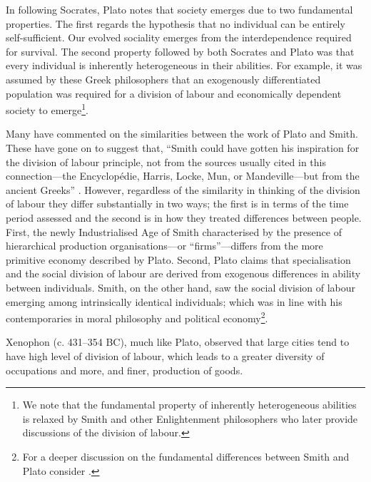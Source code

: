In following Socrates, Plato notes that society emerges due to two fundamental properties. The first regards the hypothesis that no individual can be entirely self-sufficient. Our evolved sociality emerges from the interdependence required for survival. The second property followed by both Socrates and Plato was that every individual is inherently heterogeneous in their abilities. For example, it was assumed by these Greek philosophers that an exogenously differentiated population was required for a division of labour and economically dependent society to emerge\footnote{We note that the fundamental property of inherently heterogeneous abilities is relaxed by Smith and other Enlightenment philosophers who later provide discussions of the division of labour.}.

Many have commented on the similarities between the work of Plato and Smith. These have gone on to suggest that, ``Smith could have gotten his inspiration for the division of labour principle, not from the sources usually cited in this connection---the Encyclop\'{e}die, Harris, Locke, Mun, or Mandeville---but from the ancient Greeks'' \citep[p.~221--222]{Foley1974}. However, regardless of the similarity in thinking of the division of labour they differ substantially in two ways; the first is in terms of the time period assessed and the second is in how they treated differences between people. First, the newly Industrialised Age of Smith characterised by the presence of hierarchical production organisations---or ``firms''---differs from the more primitive economy described by Plato. Second, Plato claims that specialisation and the social division of labour are derived from exogenous differences in ability between individuals. Smith, on the other hand, saw the social division of labour emerging among intrinsically identical individuals; which was in line with his contemporaries in moral philosophy and political economy\footnote{For a deeper discussion on the fundamental differences between Smith and Plato consider \citep{McNulty1975}.}.

Xenophon (c. 431--354 BC), much like Plato, observed that large cities tend to have high level of division of labour, which leads to a greater diversity of occupations and more, and finer, production of goods.

